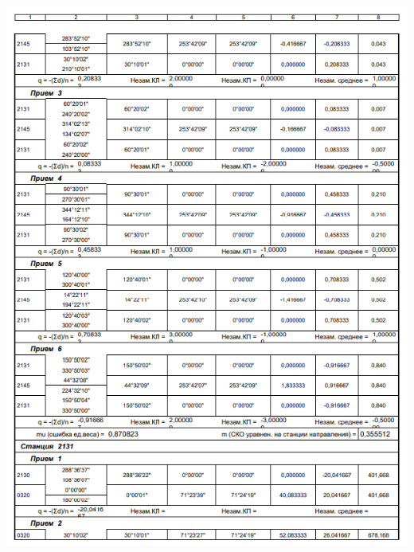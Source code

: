 \documentclass[a4paper]{article}
\begin{document}
\begin{newpage}
\begin{center}
        \includegraphics[scale=1.4]{vedomosty/скп5.png}

\end{center}
\end{newpage}
\end{document}
